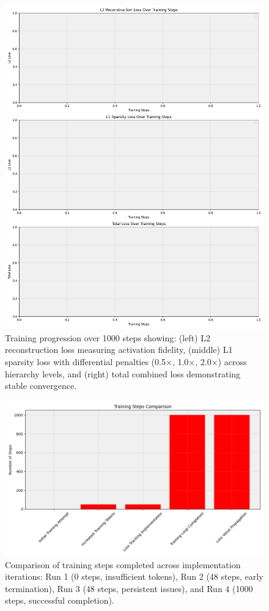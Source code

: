 \begin{figure}[t]
\centering
\includegraphics[width=\linewidth]{training_curves.png}
\caption{Training progression over 1000 steps showing: (left) L2 reconstruction loss measuring activation fidelity, (middle) L1 sparsity loss with differential penalties (0.5$\times$, 1.0$\times$, 2.0$\times$) across hierarchy levels, and (right) total combined loss demonstrating stable convergence.}
\label{fig:training_curves}
\end{figure}

\begin{figure}[t]
\centering
\includegraphics[width=\linewidth]{training_steps_comparison.png}
\caption{Comparison of training steps completed across implementation iterations: Run 1 (0 steps, insufficient tokens), Run 2 (48 steps, early termination), Run 3 (48 steps, persistent issues), and Run 4 (1000 steps, successful completion).}
\label{fig:training_steps}
\end{figure}

